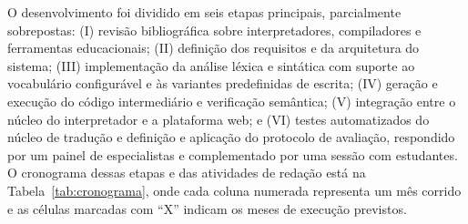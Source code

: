 O desenvolvimento foi dividido em seis etapas principais, parcialmente sobrepostas: (I) revisão bibliográfica sobre interpretadores, compiladores e ferramentas educacionais; (II) definição dos requisitos e da arquitetura do sistema; (III) implementação da análise léxica e sintática com suporte ao vocabulário configurável e às variantes predefinidas de escrita; (IV) geração e execução do código intermediário e verificação semântica; (V) integração entre o núcleo do interpretador e a plataforma web; e (VI) testes automatizados do núcleo de tradução e definição e aplicação do protocolo de avaliação, respondido por um painel de especialistas e complementado por uma sessão com estudantes. O cronograma dessas etapas e das atividades de redação está na Tabela~\ref{tab:cronograma}, onde cada coluna numerada representa um mês corrido e as células marcadas com ``X'' indicam os meses de execução previstos.


